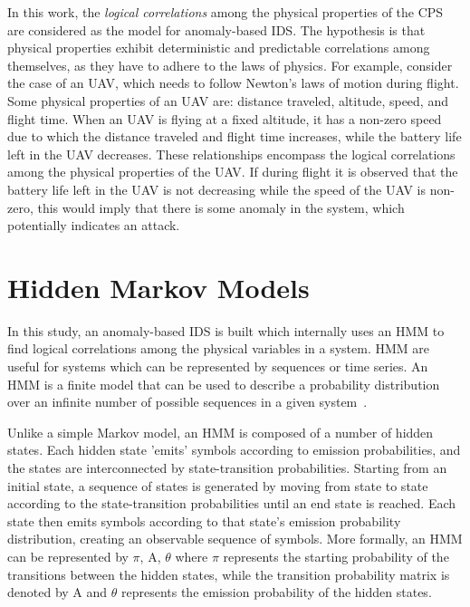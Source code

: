In this work, the {\em logical correlations} among the physical properties of the \ac{CPS} are considered as the model for anomaly-based \ac{IDS}. The hypothesis is that physical properties exhibit deterministic and predictable correlations among themselves, as they have to adhere to the laws of physics. For example, consider the case of an \ac{UAV}, which needs to follow Newton's laws of motion during flight. Some physical properties of an \ac{UAV} are: distance traveled, altitude, speed, and flight time. When an \ac{UAV} is flying at a fixed altitude, it has a non-zero speed due to which the distance traveled and flight time increases, while the battery life left in the \ac{UAV} decreases. These relationships encompass the logical correlations among the physical properties of the \ac{UAV}. If during flight it is observed that the battery life left in the \ac{UAV} is not decreasing while the speed of the \ac{UAV} is non-zero, this would imply that there is some anomaly in the system, which potentially indicates an attack.

\section{Hidden Markov Models}
\label{sec:HMM_explain}

In this study, an anomaly-based \ac{IDS} is built which internally uses an \ac{HMM} to find logical correlations among the physical variables in a system. \ac{HMM} are useful for systems which can be represented by sequences or time series. An \ac{HMM} is a finite model that can be used to describe a probability distribution over an infinite number of possible sequences in a given system~\cite{eddy1996hidden}.

Unlike a simple Markov model, an \ac{HMM} is composed of a number of hidden states. Each hidden state 'emits' symbols according to emission probabilities, and the states are interconnected by state-transition probabilities. Starting from an initial state, a sequence of states is generated by moving from state to state according to the state-transition probabilities until an end state is reached. Each state then emits symbols according to that state's emission probability distribution, creating an observable sequence of symbols.
More formally, an \ac{HMM} can be represented by $\pi$, A, $\theta$ where $\pi$ represents the starting probability of the transitions between the hidden states, while the transition probability matrix is denoted by A and $\theta$ represents the emission probability of the hidden states.

